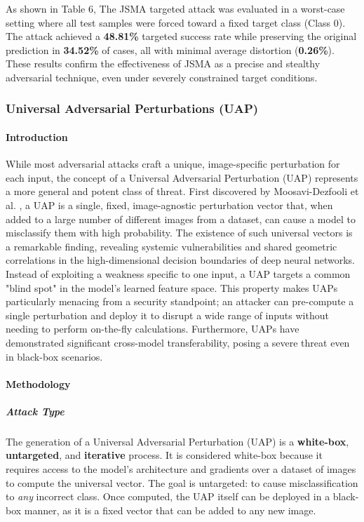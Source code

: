 \documentclass[../main.tex]{subfiles}
\begin{document}
\vspace{1em}
\noindent
As shown in Table 6, The JSMA targeted attack was evaluated in a worst-case setting where all test samples were forced toward a fixed target class (Class 0). The attack achieved a \textbf{48.81\%} targeted success rate while preserving the original prediction in \textbf{34.52\%} of cases, all with minimal average distortion (\textbf{0.26\%}). These results confirm the effectiveness of JSMA as a precise and stealthy adversarial technique, even under severely constrained target conditions.


\subsubsection{Universal Adversarial Perturbations (UAP)}

\paragraph{Introduction}
While most adversarial attacks craft a unique, image-specific perturbation for each input, the concept of a Universal Adversarial Perturbation (UAP) represents a more general and potent class of threat. First discovered by Moosavi-Dezfooli et al. \cite{moosavidezfooli2017universaladversarialperturbations}, a UAP is a single, fixed, image-agnostic perturbation vector that, when added to a large number of different images from a dataset, can cause a model to misclassify them with high probability. The existence of such universal vectors is a remarkable finding, revealing systemic vulnerabilities and shared geometric correlations in the high-dimensional decision boundaries of deep neural networks. Instead of exploiting a weakness specific to one input, a UAP targets a common "blind spot" in the model's learned feature space. This property makes UAPs particularly menacing from a security standpoint; an attacker can pre-compute a single perturbation and deploy it to disrupt a wide range of inputs without needing to perform on-the-fly calculations. Furthermore, UAPs have demonstrated significant cross-model transferability, posing a severe threat even in black-box scenarios.

      

\paragraph{Methodology}

\subparagraph{Attack Type}
The generation of a Universal Adversarial Perturbation (UAP) is a \textbf{white-box}, \textbf{untargeted}, and \textbf{iterative} process. It is considered white-box because it requires access to the model's architecture and gradients over a dataset of images to compute the universal vector. The goal is untargeted: to cause misclassification to \textit{any} incorrect class. Once computed, the UAP itself can be deployed in a black-box manner, as it is a fixed vector that can be added to any new image.
\end{document}
